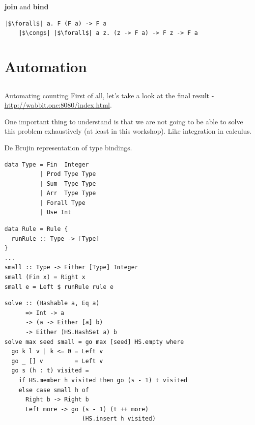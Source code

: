 \documentclass[tikz]{beamer}
\theoremstyle{definition}
\begin{document}
\begin{frame}[fragile]{\textbf{join} and \textbf{bind}}
\begin{verbatim}
|$\forall$| a. F (F a) -> F a
    |$\cong$| |$\forall$| a z. (z -> F a) -> F z -> F a
\end{verbatim}
\end{frame}

\section{Automation}
\subsection{}

\begin{frame}[fragile]{Automating counting}
First of all, let's take a look at the final result - \url{http://wabbit.one:8080/index.html}.
\end{frame}

\begin{frame}[fragile]
One important thing to understand is that we are not going to be able to solve this problem exhaustively (at least in this workshop). Like integration in calculus.
\end{frame}

\begin{frame}[fragile]
De Brujin representation of type bindings.
\begin{verbatim}
data Type = Fin  Integer
          | Prod Type Type
          | Sum  Type Type
          | Arr  Type Type
          | Forall Type
          | Use Int
\end{verbatim}
\end{frame}

\begin{frame}[fragile]
\begin{verbatim}
data Rule = Rule {
  runRule :: Type -> [Type]
}
...
small :: Type -> Either [Type] Integer
small (Fin x) = Right x
small e = Left $ runRule rule e
\end{verbatim}
\end{frame}
\begin{frame}[fragile]
\begin{verbatim}
solve :: (Hashable a, Eq a)
      => Int -> a
      -> (a -> Either [a] b)
      -> Either (HS.HashSet a) b
solve max seed small = go max [seed] HS.empty where
  go k l v | k <= 0 = Left v
  go _ [] v         = Left v
  go s (h : t) visited =
    if HS.member h visited then go (s - 1) t visited
    else case small h of
      Right b -> Right b
      Left more -> go (s - 1) (t ++ more)
                      (HS.insert h visited)
\end{verbatim}
\end{frame}
\end{document}
